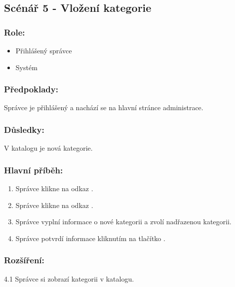 \documentclass[11pt,twoside,a4paper]{book}
\begin{document}
\subsection{Scénář 5 - Vložení kategorie}

\subsubsection*{Role:}

\begin{itemize}
\item Přihlášený správce
\item Systém
\end{itemize}

\subsubsection*{Předpoklady:}

Správce je přihlášený a nachází se na hlavní stránce administrace.

\subsubsection*{Důsledky:}

V katalogu je nová kategorie.

\subsubsection*{Hlavní příběh:}

\begin{enumerate}
\item Správce klikne na odkaz .
\item Správce klikne na odkaz .
\item Správce vyplní informace o nové kategorii a zvolí nadřazenou kategorii.
\item Správce potvrdí informace kliknutím na tlačítko .
\end{enumerate}

\subsubsection*{Rozšíření:}

\begin{description}
\item  4.1 Správce si zobrazí kategorii v katalogu.
\end{description}
\end{document}
